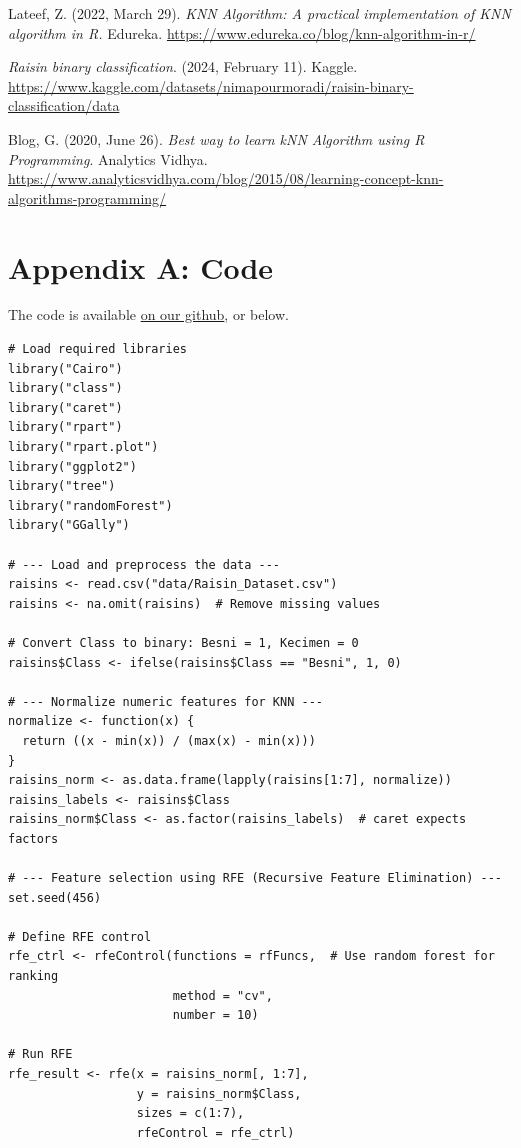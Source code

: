 \documentclass{article}
\begin{document}
\clearpage
\begin{thebibliography}{9}

Lateef, Z. (2022, March 29). \emph{KNN Algorithm: A practical implementation of KNN algorithm in R.} Edureka. \url{https://www.edureka.co/blog/knn-algorithm-in-r/}

\emph{Raisin binary classification}. (2024, February 11). Kaggle. \url{https://www.kaggle.com/datasets/nimapourmoradi/raisin-binary-classification/data}


Blog, G. (2020, June 26). \emph{Best way to learn kNN Algorithm using R Programming}. Analytics Vidhya. \url{https://www.analyticsvidhya.com/blog/2015/08/learning-concept-knn-algorithms-programming/}

\newpage

\section*{Appendix A: Code}
\label{sec:appendixA}
The code is available \href{https://github.com/mshki/math-456/blob/main/essay_4/main.R}{on our github}, or below.

\begin{verbatim}
# Load required libraries
library("Cairo")
library("class")
library("caret")
library("rpart")
library("rpart.plot")
library("ggplot2")
library("tree")
library("randomForest")
library("GGally")

# --- Load and preprocess the data ---
raisins <- read.csv("data/Raisin_Dataset.csv")
raisins <- na.omit(raisins)  # Remove missing values

# Convert Class to binary: Besni = 1, Kecimen = 0
raisins$Class <- ifelse(raisins$Class == "Besni", 1, 0)

# --- Normalize numeric features for KNN ---
normalize <- function(x) {
  return ((x - min(x)) / (max(x) - min(x)))
}
raisins_norm <- as.data.frame(lapply(raisins[1:7], normalize))
raisins_labels <- raisins$Class
raisins_norm$Class <- as.factor(raisins_labels)  # caret expects factors

# --- Feature selection using RFE (Recursive Feature Elimination) ---
set.seed(456)

# Define RFE control
rfe_ctrl <- rfeControl(functions = rfFuncs,  # Use random forest for ranking
                       method = "cv", 
                       number = 10)

# Run RFE
rfe_result <- rfe(x = raisins_norm[, 1:7],
                  y = raisins_norm$Class,
                  sizes = c(1:7),
                  rfeControl = rfe_ctrl)


\end{verbatim}
\end{thebibliography}
\end{document}

